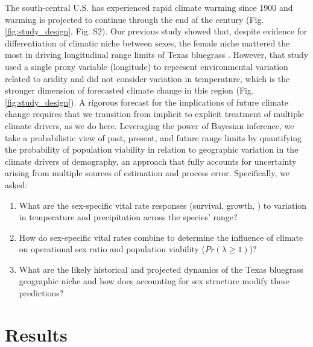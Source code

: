 \documentclass[9pt,twocolumn,twoside,lineno]{pnas-new}
\newcommand{\revise}[1]{{\color{Mahogany}{#1}}}
\begin{document}
The south-central U.S. has experienced rapid climate warming since 1900 and warming is projected to continue through the end of the century (Fig. \ref{fig:study_design}, Fig. S2). 
Our previous study showed that, despite evidence for differentiation of climatic niche between sexes, the female niche mattered the most in driving longitudinal range limits of Texas bluegrass \citep{miller2022two}. 
However, that study used a single proxy variable (longitude) to represent environmental variation related to aridity and did not consider variation in temperature, which is the stronger dimension of forecasted climate change in this region (Fig. \ref{fig:study_design}). 
A rigorous forecast for the implications of future climate change requires that we transition from implicit to explicit treatment of multiple climate drivers, as we do here.
Leveraging the power of Bayesian inference, we take a probabilistic view of past, present, and future range limits by quantifying the probability of population viability \revise{($Pr(\lambda \ge 1)$)} in relation to geographic variation in the climate drivers of demography, an approach that fully accounts for uncertainty arising from multiple sources of estimation and process error. %
Specifically, we asked:
\begin{enumerate}
	\item What are the sex-specific vital rate responses (survival, growth, \revise{and reproduction}) to variation in temperature and precipitation across the species' range?
	\item How do sex-specific vital rates combine to determine the influence of climate on operational sex ratio and population viability ($Pr(\lambda \ge 1)$)?
	\item What are the likely historical and projected dynamics of the Texas bluegrass geographic niche and how does accounting for sex structure modify these predictions?
\end{enumerate}

\section*{Results}
\end{document}
